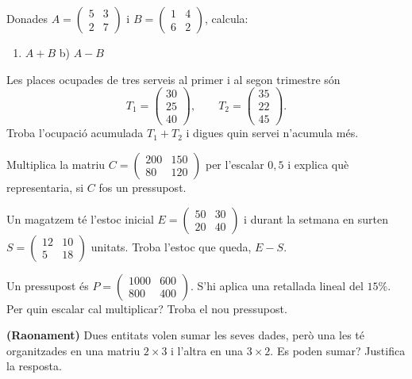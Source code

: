 \begin{exercicis}
\begin{exlist}
  \item Donades $A=\begin{pmatrix} 5 & 3 \\ 2 & 7 \end{pmatrix}$ i
        $B=\begin{pmatrix} 1 & 4 \\ 6 & 2 \end{pmatrix}$, calcula:
        \begin{enumerate}[label=\alph*), leftmargin=1.6em, topsep=2pt]
          \item $A+B$ \qquad b) $A-B$
        \end{enumerate}
  \item Les places ocupades de tres serveis al primer i al segon trimestre són
        \[ T_1=\begin{pmatrix} 30 \\ 25 \\ 40 \end{pmatrix},\qquad
           T_2=\begin{pmatrix} 35 \\ 22 \\ 45 \end{pmatrix}. \]
        Troba l'ocupació acumulada $T_1+T_2$ i digues quin servei n'acumula més.
  \item Multiplica la matriu $C=\begin{pmatrix} 200 & 150 \\ 80 & 120 \end{pmatrix}$
        per l'escalar $0{,}5$ i explica què representaria, si $C$ fos un pressupost.
  \item Un magatzem té l'estoc inicial $E=\begin{pmatrix} 50 & 30 \\ 20 & 40 \end{pmatrix}$
        i durant la setmana en surten $S=\begin{pmatrix} 12 & 10 \\ 5 & 18 \end{pmatrix}$
        unitats. Troba l'estoc que queda, $E-S$.
  \item Un pressupost és $P=\begin{pmatrix} 1000 & 600 \\ 800 & 400 \end{pmatrix}$.
        S'hi aplica una retallada lineal del $15\%$. Per quin escalar cal
        multiplicar? Troba el nou pressupost.
  \item \textbf{(Raonament)} Dues entitats volen sumar les seves dades, però una
        les té organitzades en una matriu $2\times 3$ i l'altra en una $3\times 2$.
        Es poden sumar? Justifica la resposta.
\end{exlist}
\end{exercicis}

